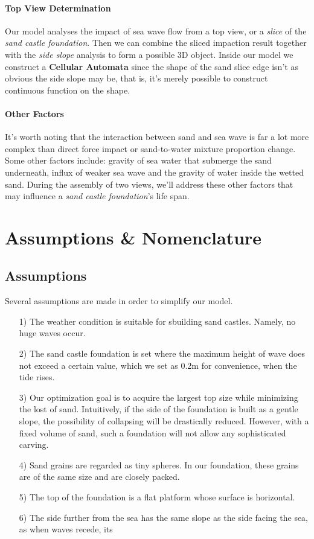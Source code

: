\documentclass[12pt]{article}
\begin{document}
\paragraph{Top View Determination}
Our model analyses the impact of sea wave flow from a top view, or a \textit{slice} of the \textit{sand castle foundation}. Then we can combine the sliced impaction result together with the \textit{side slope} analysis to form a possible 3D object. Inside our model we construct a \textbf{Cellular Automata} since the shape of the sand slice edge isn't as obvious the side slope may be, that is, it's merely possible to construct continuous function on the shape.

\paragraph{Other Factors}
It's worth noting that the interaction between sand and sea wave is far a lot more complex than direct force impact or sand-to-water mixture proportion change. Some other factors include: gravity of sea water that submerge the sand underneath, influx of weaker sea wave and the gravity of water inside the wetted sand. During the assembly of two views, we'll address these other factors that may influence a \textit{sand castle foundation}'s life span.

\section{Assumptions \& Nomenclature}
\subsection{Assumptions}
Several assumptions are made in order to simplify our model.
\begin{itemize}
    \item [1)]
          The weather condition is suitable for sbuilding sand castles. Namely, no huge waves occur.
    \item [2)]
          The sand castle foundation is set where the maximum height of wave does not exceed a certain value, which we set as 0.2m for convenience, when the tide rises.
    \item [3)]
          Our optimization goal is to acquire the largest top size while minimizing the lost of sand. Intuitively, if the side of the foundation is built as a gentle slope, the possibility of collapsing will be drastically reduced. However, with a fixed volume of sand, such a foundation will not allow any sophisticated carving.
    \item [4)]
          Sand grains are regarded as tiny spheres. In our foundation, these grains are of the same size and are closely packed.
    \item [5)]
          The top of the foundation is a flat platform whose surface is horizontal.
    \item [6)]
          The side further from the sea has the same slope as the side facing the sea, as when waves recede, its 
\end{itemize}
\end{document}
